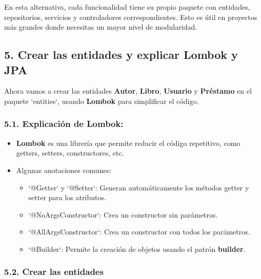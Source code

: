 \documentclass[11pt]{article}
\begin{document}
En esta alternativa, cada funcionalidad tiene su propio paquete con entidades, repositorios, servicios y controladores correspondientes. Esto es útil en proyectos más grandes donde necesitas un mayor nivel de modularidad.

\subsection{5. Crear las entidades y explicar Lombok y JPA}
\label{sec:org5cc7c8f}
Ahora vamos a crear las entidades \textbf{\textbf{Autor}}, \textbf{\textbf{Libro}}, \textbf{\textbf{Usuario}} y \textbf{\textbf{Préstamo}} en el paquete `entities`, usando \textbf{\textbf{Lombok}} para simplificar el código.

\subsubsection{5.1. Explicación de Lombok:}
\label{sec:orge60a6da}
\begin{itemize}
\item \textbf{\textbf{Lombok}} es una librería que permite reducir el código repetitivo, como getters, setters, constructores, etc.
\item Algunas anotaciones comunes:
\begin{itemize}
\item `@Getter` y `@Setter`: Generan automáticamente los métodos getter y setter para los atributos.
\item `@NoArgsConstructor`: Crea un constructor sin parámetros.
\item `@AllArgsConstructor`: Crea un constructor con todos los parámetros.
\item `@Builder`: Permite la creación de objetos usando el patrón \textbf{builder}.
\end{itemize}
\end{itemize}

\subsubsection{5.2. Crear las entidades}
\label{sec:orgd8ebe46}
\end{document}
